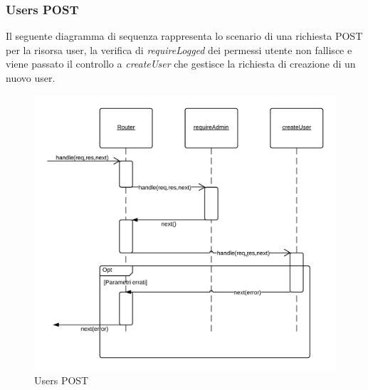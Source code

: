 \subsubsection{Users POST} 
Il seguente diagramma di sequenza rappresenta lo scenario di una richiesta POST per la risorsa user, la verifica di \emph{requireLogged} dei permessi utente non fallisce e viene passato il controllo a \emph{createUser} che gestisce la richiesta di creazione di un nuovo user.
\begin{figure}[H]
	\begin{center} 
		\includegraphics[scale=0.20]{scenari/Users POST.png} 
		\caption{Users POST}
	\end{center} 
\end{figure}

